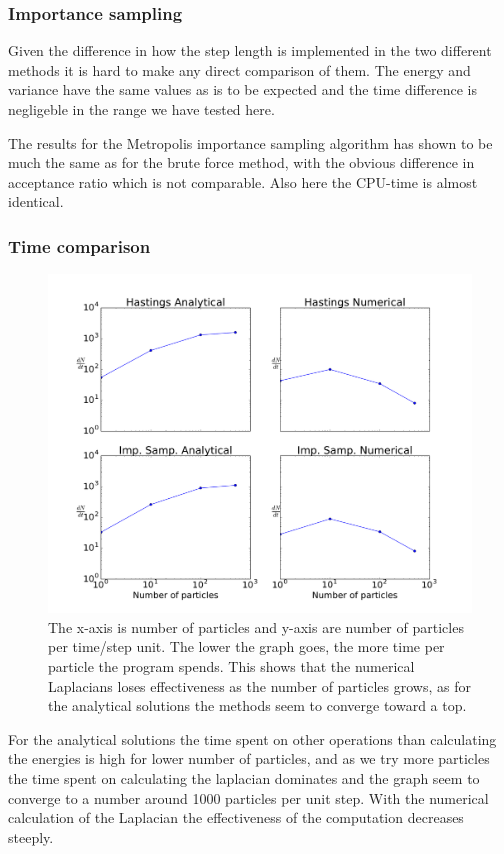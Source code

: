 \documentclass[12pt]{article}
\begin{document}
  \subsubsection{Importance sampling}
  
  Given the difference in how the step length is implemented in the two different methods it is
  hard to make any direct comparison of them. The energy and variance have the same values as is
  to be expected and the time difference is negligeble in the range we have tested here.
  \newpage
  
  The results for the Metropolis importance sampling algorithm has shown to be much the same as for
  the brute force method, with the obvious difference in acceptance ratio which is not comparable.
  Also here the CPU-time is almost identical.

  \newpage

  \subsubsection{Time comparison}
  \begin{figure}[h!]
    \centerline{
    \includegraphics[scale=0.49]{graphs/Npart_time.pdf}
  }
    \caption{The x-axis is number of particles and y-axis are number of particles per time/step %
	     unit. The lower the graph goes, the more time per particle the program spends. %
	     This shows that the numerical Laplacians loses effectiveness as the number of %
	     particles grows, as for the analytical solutions the methods seem to converge %
	     toward a top.%
	     }
    
  \end{figure}
  For the analytical solutions the time spent on other operations than calculating the energies
  is high for lower number of particles, and as we try more particles the time spent on calculating
  the laplacian dominates and the graph seem to converge to a number around 1000 particles per unit
  step. With the numerical calculation of the Laplacian the effectiveness of the computation
  decreases steeply.



  \appendix
  
\end{document}

